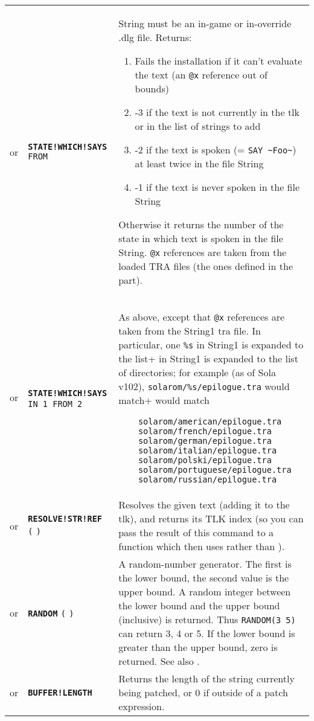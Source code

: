 \documentclass{article}
\def\ttref#1{\ahrefloc{#1}{\tt #1}}
\def\DEFINE#1{{\tt \bf #1}\label{#1}\index{#1}}
\def\DEFSYN#1{{\tt \bf #1}\index{#1}}
\def\t#1{{\tt #1}}
\begin{document}
\begin{tabular}{cp{10in}|p{10in}}
or & \DEFINE{STATE!WHICH!SAYS} \ttref{text} \t{FROM} \ttref{String} &
  String must be an in-game or in-override .dlg file. Returns:
  \begin{enumerate}
  \item Fails the installation if it can't evaluate the text (an \t{@x} reference out of bounds)
  \item -3 if the text is not currently in the tlk or in the list of strings to add
  \item -2 if the text is spoken (= \verb+SAY ~Foo~+) at least twice in the file String
  \item -1 if the text is never spoken in the file String
  \end{enumerate}
  Otherwise it returns the number of the state in which text is spoken in the file String.
  \t{@x} references are taken from the loaded TRA files (the ones defined in the
  \ttref{Language} part).
\\

or & \DEFSYN{STATE!WHICH!SAYS} \t{\ttref{value} IN \ttref{String}1 FROM \ttref{String}2} &
  As above, except that \t{@x} references are taken from
    the String1 tra file. In particular, one \verb+%s+ in String1 is expanded to the list
    of directories; for example (as of Sola v102), \verb+solarom/%s/epilogue.tra+ would match
\begin{verbatim}
    solarom/american/epilogue.tra
    solarom/french/epilogue.tra
    solarom/german/epilogue.tra
    solarom/italian/epilogue.tra
    solarom/polski/epilogue.tra
    solarom/portuguese/epilogue.tra
    solarom/russian/epilogue.tra
\end{verbatim}
\\
or & \DEFINE{RESOLVE!STR!REF} \t{(} \ttref{text} \t{)} &
Resolves the given text (adding it to the tlk), and returns its TLK index
(so you can pass the result of this command to a function which then uses
\ttref{WRITE!LONG} rather than \ttref{SAY}).
\\
or & \DEFINE{RANDOM} \t{(} \ttref{value} \ttref{value} \t{)} &
A random-number generator. The first \ttref{value} is the lower bound, the
second value is the upper bound. A random integer between the lower bound
and the upper bound (inclusive) is returned. Thus \t{RANDOM(3 5)} can
return 3, 4 or 5. If the lower bound is greater than the upper bound, zero
is returned. See also \ttref{RANDOM!SEED}. \\

or & \DEFINE{BUFFER!LENGTH} &
Returns the length of the string currently being patched, or 0 if outside of
a patch expression. \\


\end{tabular}
\end{document}
